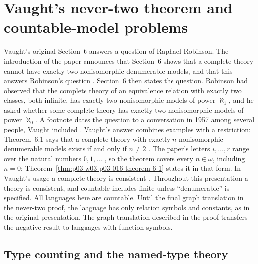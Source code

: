 \section{Vaught's never-two theorem and countable-model problems}
\label{sec:p03-vaught-never-two-presentation}

Vaught's original Section~6 answers a question of Raphael Robinson. The
introduction of the paper announces that Section~6 shows that a complete
theory cannot have exactly two nonisomorphic denumerable models, and that
this answers Robinson's question \cite[p.~304]{Vaught1961}. Section~6 then
states the question. Robinson had observed that the complete theory of an
equivalence relation with exactly two classes, both infinite, has exactly two
nonisomorphic models of power \(\aleph_1\), and he asked whether some
complete theory has exactly two nonisomorphic models of power \(\aleph_0\).
A footnote dates the question to a conversation in 1957 among several
people, Vaught included \cite[p.~318 and n.~23]{Vaught1961}. Vaught's
answer combines examples with a restriction: Theorem~6.1 says that a
complete theory with exactly \(n\) nonisomorphic denumerable models exists
if and only if \(n\ne2\) \cite[pp.~318--320]{Vaught1961}. The paper's letters
\(i,\ldots,r\) range over the natural numbers \(0,1,\ldots\)
\cite[p.~304, n.~5]{Vaught1961}, so the theorem covers every \(n\in\omega\),
including \(n=0\); Theorem~\ref{thm:p03-w03-p03-016-theorem-6-1} states
it in that form. In Vaught's usage a complete theory is consistent
\cite[p.~303, n.~1]{Vaught1961}. Throughout this presentation a theory is
consistent, and countable includes finite unless ``denumerable'' is specified.
All languages here are countable. Until the final graph translation in the
never-two proof, the language has only relation symbols and constants, as in
the original presentation.
The graph translation described in the proof transfers the negative result
to languages with function symbols.

\subsection{Type counting and the named-type theory}
\label{sec:p03-vaught-never-two-types}

